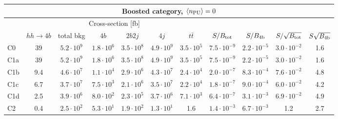 \begin{tabular}{|l|cc|cccc|cccc|}
  \hline
\multicolumn{11}{|c|}{Boosted category, $\left\langle n_{\rm PU}\right\rangle=0$}\\
\hline
&  \multicolumn{6}{c|}{Cross-section [fb]} &  &  & &  \\
   &  $hh\to 4b$ &  total bkg  &   $4b$    &  $2b2j$   &   $4j$    &
$t\bar{t}$ &
$S/B_{\rm tot}$ & $S/B_{\rm 4b}$ & $S/\sqrt{B_{\rm tot}}$ & $S\sqrt{B_{\rm 4b}}$ \\
  \hline
  \hline
C0      & 39  &   $5.2\cdot 10^9$   & $1.8\cdot 10^6$ & $3.5\cdot 10^8$ & $4.9\cdot 10^9$ & $3.5\cdot 10^5$  &   $7.5\cdot 10^{-9}$   & $2.2\cdot 10^{-5}$  &  $ 3.0\cdot 10^{-2}$   & 1.6 \\
 C1a     & 39  &   $5.2\cdot 10^9$   & $1.8\cdot 10^6$ & $3.5\cdot 10^8$ & $4.9\cdot 10^9$ & $3.5\cdot 10^5$  &   $7.5\cdot 10^{-9}$   & $2.2\cdot 10^{-5}$ &  $ 3.0\cdot 10^{-2}$   & 1.6  \\
 C1b     & 9.4  &   $4.6\cdot 10^7$   & $1.1\cdot 10^4$ & $2.9\cdot 10^6$ & $4.3\cdot 10^7$ & $2.4\cdot 10^4$ &   $2.0\cdot 10^{-7}$   & $8.3\cdot 10^{-4}$ &  $ 7.6\cdot 10^{-2}$   & 4.8 \\
 C1c     & 6.7  &   $3.7\cdot 10^7$   & $7.5\cdot 10^3$ & $2.1\cdot 10^6$ & $3.5\cdot 10^7$ & $2.2\cdot 10^4$ &   $1.8\cdot 10^{-7}$   & $9.0\cdot 10^{-4}$ &  $ 6.0\cdot 10^{-2}$   & 4.2  \\
 C1d     & 2.5  &   $3.9\cdot 10^6$   & $8.0\cdot 10^2$ & $2.3\cdot 10^5$ & $3.7\cdot 10^6$ & $7.1\cdot 10^3$   &   $6.4\cdot 10^{-7}$   & $3.1\cdot 10^{-3}$ &  $ 6.9\cdot 10^{-2}$   & 4.9\\
 C2      & 0.4  &   $2.5\cdot 10^2$   & $5.3\cdot 10^1$ & $1.9\cdot 10^2$ & $1.3\cdot 10^1$ & 1.6  &   $1.4\cdot 10^{-3}$   & $6.7\cdot 10^{-3}$ &   1.2   & 2.7  \\
\hline
\end{tabular}
